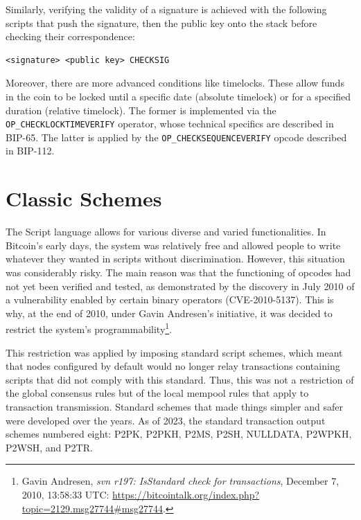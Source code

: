 \documentclass[
  a5paper,
  smalldemyvopaper,10pt,twoside,onecolumn,openright,extrafontsizes,hidelinks]{memoir}
\begin{document}
Similarly, verifying the validity of a signature is achieved with the
following scripts that push the signature, then the public key onto the
stack before checking their correspondence:

\begin{verbatim}
<signature> <public key> CHECKSIG
\end{verbatim}

Moreover, there are more advanced conditions like timelocks. These allow
funds in the coin to be locked until a specific date (absolute timelock)
or for a specified duration (relative timelock). The former is
implemented via the \texttt{OP\_CHECKLOCKTIMEVERIFY} operator, whose
technical specifics are described in BIP-65. The latter is applied by
the \texttt{OP\_CHECKSEQUENCEVERIFY} opcode described in BIP-112.

\section*{Classic Schemes}\label{classic-schemes}


The Script language allows for various diverse and varied
functionalities. In Bitcoin's early days, the system was relatively free
and allowed people to write whatever they wanted in scripts without
discrimination. However, this situation was considerably risky. The main
reason was that the functioning of opcodes had not yet been verified and
tested, as demonstrated by the discovery in July 2010 of a vulnerability
enabled by certain binary operators (CVE-2010-5137). This is why, at the
end of 2010, under Gavin Andresen's initiative, it was decided to
restrict the system's programmability\footnote{Gavin Andresen, \emph{svn
  r197: IsStandard check for transactions}, December 7, 2010, 13:58:33
  UTC:
  \url{https://bitcointalk.org/index.php?topic=2129.msg27744\#msg27744}.}.

This restriction was applied by imposing standard script schemes, which
meant that nodes configured by default would no longer relay
transactions containing scripts that did not comply with this standard.
Thus, this was not a restriction of the global consensus rules but of
the local mempool rules that apply to transaction transmission. Standard
schemes that made things simpler and safer were developed over the
years. As of 2023, the standard transaction output schemes numbered
eight: P2PK, P2PKH, P2MS, P2SH, NULLDATA, P2WPKH, P2WSH, and P2TR.
\end{document}
